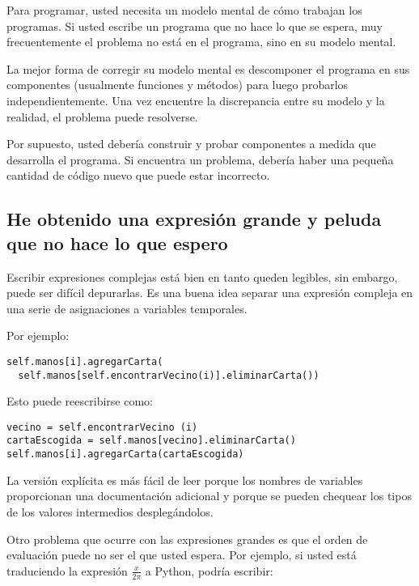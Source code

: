 Para programar, usted necesita un modelo mental de cómo trabajan
los programas. Si usted escribe un programa que no hace lo que
se espera, muy frecuentemente el problema no está en el 
programa, sino en su modelo mental.


La mejor forma de corregir su modelo mental es descomponer el
programa en sus componentes (usualmente funciones y métodos) para
luego probarlos independientemente. Una vez encuentre la 
discrepancia entre su modelo y la realidad, el problema puede
resolverse.

Por supuesto, usted debería construir y probar componentes a 
medida que desarrolla el programa. Si encuentra un problema,
debería haber una pequeña cantidad de código nuevo que puede
estar incorrecto.


\subsection{He obtenido una expresión grande y peluda
que no hace lo que espero}

Escribir expresiones complejas está bien en tanto queden 
legibles, sin embargo, puede ser difícil depurarlas. Es una
buena idea separar una expresión compleja en una serie
de asignaciones a variables temporales.

Por ejemplo:

\beforeverb
\begin{verbatim}
self.manos[i].agregarCarta(
  self.manos[self.encontrarVecino(i)].eliminarCarta())
\end{verbatim}
\afterverb
%
Esto puede reescribirse como:

\beforeverb
\begin{verbatim}
vecino = self.encontrarVecino (i)
cartaEscogida = self.manos[vecino].eliminarCarta()
self.manos[i].agregarCarta(cartaEscogida)
\end{verbatim}
\afterverb
%
La versión explícita es más fácil de leer porque los nombres de
variables proporcionan una documentación adicional y porque se
pueden chequear los tipos de los valores intermedios desplegándolos.


Otro problema que ocurre con las expresiones grandes es
que el orden de evaluación puede no ser el que usted espera.
Por ejemplo, si usted está traduciendo la expresión
$\frac{x}{2 \pi}$ a  Python, podría escribir:

